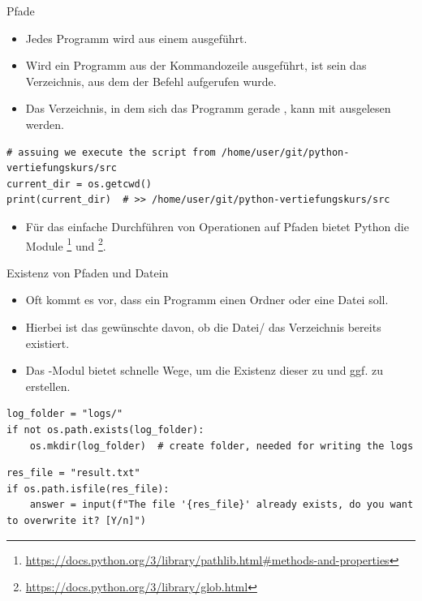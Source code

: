 \documentclass[12pt, aspectratio=169, usepdftitle=false]{beamer}
\newcommand{\pp}[1]{\lpl{#1}}
\newcommand{\furl}[1]{\footnote{\url{#1}}}
\begin{document}
\begin{frame}[fragile]{Pfade}
	\begin{itemize}
		\item Jedes Programm wird aus einem  ausgeführt.
		\item Wird ein Programm aus der Kommandozeile ausgeführt, ist sein  das Verzeichnis, aus dem der Befehl aufgerufen wurde.
		\pause
		\item Das Verzeichnis, in dem sich das Programm gerade , kann mit \pp{os.getcwd()} ausgelesen werden.
	\end{itemize}
	\begin{lstlisting}[language=pytiny]
# assuing we execute the script from /home/user/git/python-vertiefungskurs/src
current_dir = os.getcwd()
print(current_dir)  # >> /home/user/git/python-vertiefungskurs/src
\end{lstlisting}
\begin{itemize}
	\item Für das einfache Durchführen von  Operationen auf Pfaden bietet Python die Module \pp{Pathlib}\furl{https://docs.python.org/3/library/pathlib.html\#methods-and-properties} und \pp{glob}\furl{https://docs.python.org/3/library/glob.html}.
\end{itemize}
	
\end{frame}


\begin{frame}[fragile]{Existenz von Pfaden und Datein}
	\begin{itemize}
		\item Oft kommt es vor, dass ein Programm einen Ordner oder eine Datei  soll.
		\pause
		\item Hierbei ist das gewünschte  davon, ob die Datei/ das Verzeichnis bereits existiert.
		\pause
		\item Das \pp{os}-Modul bietet schnelle Wege, um die Existenz dieser zu  und ggf. zu erstellen.
	\end{itemize}
	\begin{lstlisting}[language=pytiny]
log_folder = "logs/"
if not os.path.exists(log_folder):
    os.mkdir(log_folder)  # create folder, needed for writing the logs 
	\end{lstlisting}
    \begin{lstlisting}[language=pytiny]
res_file = "result.txt"
if os.path.isfile(res_file):
    answer = input(f"The file '{res_file}' already exists, do you want to overwrite it? [Y/n]")
\end{lstlisting}
\end{frame}
\end{document}
